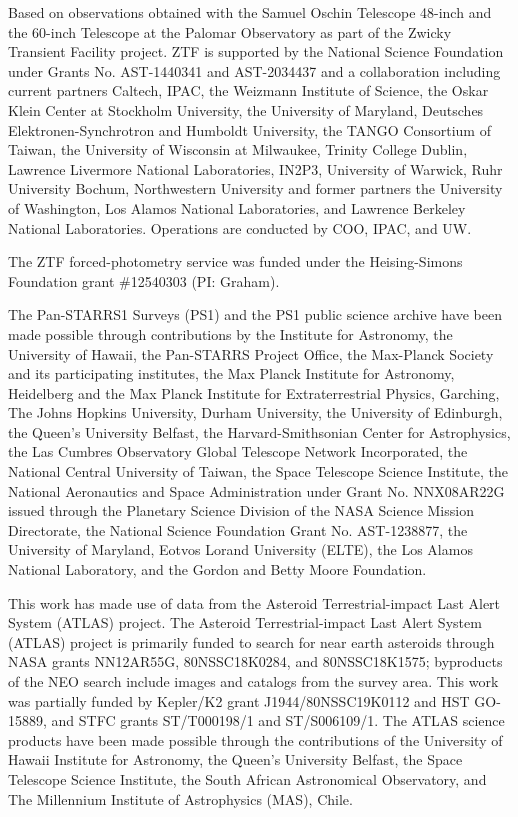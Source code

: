 \documentclass{nature_plusfigure}
\begin{document}
\begin{addendum}
Based on observations obtained with the Samuel Oschin Telescope 48-inch and the 60-inch Telescope at the Palomar Observatory as part of the Zwicky Transient Facility project. ZTF is supported by the National Science Foundation under Grants No. AST-1440341 and AST-2034437 and a collaboration including current partners Caltech, IPAC, the Weizmann Institute of Science, the Oskar Klein Center at Stockholm University, the University of Maryland, Deutsches Elektronen-Synchrotron and Humboldt University, the TANGO Consortium of Taiwan, the University of Wisconsin at Milwaukee, Trinity College Dublin, Lawrence Livermore National Laboratories, IN2P3, University of Warwick, Ruhr University Bochum, Northwestern University and former partners the University of Washington, Los Alamos National Laboratories, and Lawrence Berkeley National Laboratories. Operations are conducted by COO, IPAC, and UW.

The ZTF forced-photometry service was funded under the Heising-Simons Foundation grant \#12540303 (PI: Graham).

The Pan-STARRS1 Surveys (PS1) and the PS1 public science archive have been made possible through contributions by the Institute for Astronomy, the University of Hawaii, the Pan-STARRS Project Office, the Max-Planck Society and its participating institutes, the Max Planck Institute for Astronomy, Heidelberg and the Max Planck Institute for Extraterrestrial Physics, Garching, The Johns Hopkins University, Durham University, the University of Edinburgh, the Queen's University Belfast, the Harvard-Smithsonian Center for Astrophysics, the Las Cumbres Observatory Global Telescope Network Incorporated, the National Central University of Taiwan, the Space Telescope Science Institute, the National Aeronautics and Space Administration under Grant No. NNX08AR22G issued through the Planetary Science Division of the NASA Science Mission Directorate, the National Science Foundation Grant No. AST-1238877, the University of Maryland, Eotvos Lorand University (ELTE), the Los Alamos National Laboratory, and the Gordon and Betty Moore Foundation.

This work has made use of data from the Asteroid Terrestrial-impact Last Alert System (ATLAS) project. The Asteroid Terrestrial-impact Last Alert System (ATLAS) project is primarily funded to search for near earth asteroids through NASA grants NN12AR55G, 80NSSC18K0284, and 80NSSC18K1575; byproducts of the NEO search include images and catalogs from the survey area. This work was partially funded by Kepler/K2 grant J1944/80NSSC19K0112 and HST GO-15889, and STFC grants ST/T000198/1 and ST/S006109/1. The ATLAS science products have been made possible through the contributions of the University of Hawaii Institute for Astronomy, the Queen’s University Belfast, the Space Telescope Science Institute, the South African Astronomical Observatory, and The Millennium Institute of Astrophysics (MAS), Chile.


\end{addendum}
\end{document}
